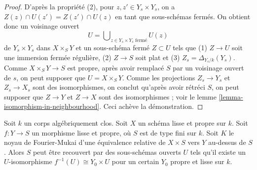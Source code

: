 \begin{proof}
\noindent
D'après la propriété (2), pour $z, z' \in Y_s \times Y_s$, on
a $Z(z) \cap U(z') = Z(z') \cap U(z)$ en tant que sous-schémas fermés.
On obtient donc un voisinage ouvert
$$
U = \bigcup\nolimits_{z \in Y_s \times Y_s\text{ fermé}} U(z)
$$
de $Y_s \times Y_s$ dans $X \times_S Y$ et un sous-schéma fermé $Z \subset U$
tels que (1) $Z \to U$ soit une immersion fermée régulière,
(2) $Z \to S$ soit plat et (3) $Z_s = \Delta_{Y_s/k}(Y_s)$.
Comme $X \times_S Y \to S$ est propre, après avoir remplacé $S$
par un voisinage ouvert de $s$, on peut supposer que $U = X \times_S Y$.
Comme les projections $Z_s \to Y_s$ et $Z_s \to X_s$
sont des isomorphismes, on conclut qu'après avoir rétréci $S$,
on peut supposer que $Z \to Y$ et $Z \to X$ sont des isomorphismes ; voir
le lemme \ref{lemma-isomorphism-in-neighbourhood}.
Ceci achève la démonstration.
\end{proof}

\begin{lemma}
\label{lemma-no-deformations-better}
Soit $k$ un corps algébriquement clos. Soit $X$
un schéma lisse et propre sur $k$.
Soit $f : Y \to S$ un morphisme lisse et propre, où $S$ est de type fini sur $k$.
Soit $K$ le noyau de Fourier-Mukai d'une équivalence relative
de $X \times S$ vers $Y$ au-dessus de $S$. Alors $S$ peut être recouvert par des
sous-schémas ouverts $U$ tels qu'il existe un $U$-isomorphisme
$f^{-1}(U) \cong Y_0 \times U$ pour un certain $Y_0$ propre et lisse sur $k$.
\end{lemma}

